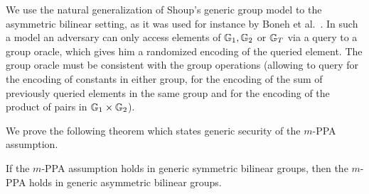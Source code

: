 We use the natural generalization of Shoup's generic group model \cite{EC:Shoup97} to the asymmetric bilinear setting, as it was used for instance by Boneh et al.~\cite{EC:BonBoyGoh05}. In such a model an adversary can only access elements of $\mathbb{G}_1,\mathbb{G}_2$ or $\mathbb{G}_T$ via a query to a group oracle, which gives him a randomized  encoding of the queried element. The group oracle must be consistent with the group operations (allowing to query for the encoding of constants in either group, for the encoding of the sum of previously queried elements in the same group and for the encoding of the product of pairs in $\mathbb{G}_1\times \mathbb{G}_2$).

We prove the following theorem which states generic security of the $m$-PPA assumption.

\begin{theorem}
	If the $m$-PPA assumption holds in generic symmetric bilinear groups, then the $m$-PPA holds in generic asymmetric bilinear groups.
\end{theorem}
